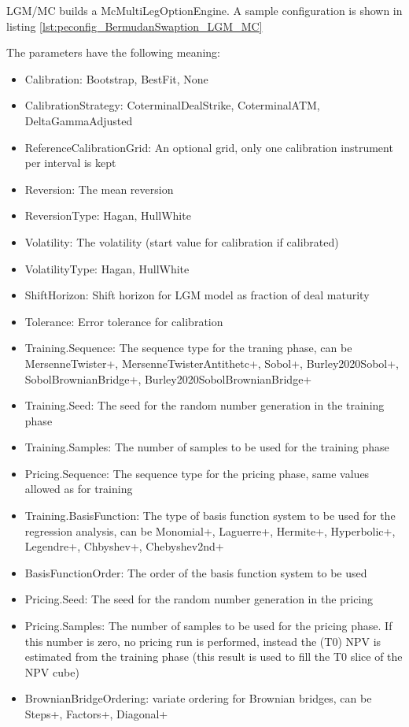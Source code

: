 LGM/MC builds a McMultiLegOptionEngine. A sample configuration is shown in
listing \ref{lst:peconfig_BermudanSwaption_LGM_MC}

The parameters have the following meaning:

\begin{itemize}
\item Calibration: Bootstrap, BestFit, None
\item CalibrationStrategy: CoterminalDealStrike, CoterminalATM, DeltaGammaAdjusted
\item ReferenceCalibrationGrid: An optional grid, only one calibration instrument per interval is kept
\item Reversion: The mean reversion
\item ReversionType: Hagan, HullWhite
\item Volatility: The volatility (start value for calibration if calibrated)
\item VolatilityType: Hagan, HullWhite
\item ShiftHorizon: Shift horizon for LGM model as fraction of deal maturity
\item Tolerance: Error tolerance for calibration
\item Training.Sequence: The sequence type for the traning phase, can be MersenneTwister+, MersenneTwisterAntithetc+,
  Sobol+, Burley2020Sobol+, SobolBrownianBridge+, Burley2020SobolBrownianBridge+
\item Training.Seed: The seed for the random number generation in the training phase
\item Training.Samples: The number of samples to be used for the training phase
\item Pricing.Sequence: The sequence type for the pricing phase, same values allowed as for training
\item Training.BasisFunction: The type of basis function system to be used for the regression analysis, can be
  Monomial+, Laguerre+, Hermite+, Hyperbolic+, Legendre+, Chbyshev+, Chebyshev2nd+
\item BasisFunctionOrder: The order of the basis function system to be used
\item Pricing.Seed: The seed for the random number generation in the pricing
\item Pricing.Samples: The number of samples to be used for the pricing phase. If this number is zero, no pricing run is
  performed, instead the (T0) NPV is estimated from the training phase (this result is used to fill the T0 slice of the
  NPV cube)
\item BrownianBridgeOrdering: variate ordering for Brownian bridges, can be Steps+, Factors+, Diagonal+

\end{itemize}
